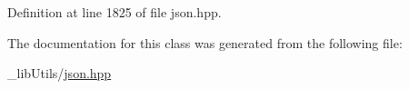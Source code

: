 Definition at line 1825 of file json.\+hpp.



The documentation for this class was generated from the following file\+:\begin{DoxyCompactItemize}
\item 
\+\_\+lib\+Utils/\hyperlink{json_8hpp}{json.\+hpp}\end{DoxyCompactItemize}

